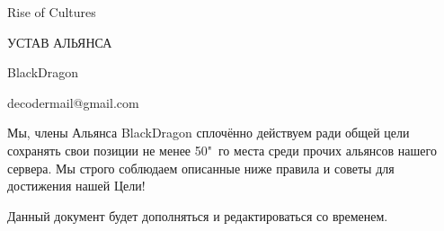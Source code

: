 \documentclass[utf8, 14pt]{my-class}
\begin{document}
    
    {
        \fancyhead{}
        \fancyfoot{}
        \fancyhead{}
    }
    
    \thispagestyle{firststyle}
    
    \vspace*{\fill}
    \begin{center}
        \Huge
        
        Rise of Cultures
        
        \bigskip
        
        УСТАВ АЛЬЯНСА
        
        BlackDragon
    \end{center}
    \vspace*{\fill}
    \begin{center}
        decodermail@gmail.com
    \end{center}

    \newpage
    
    {
        \hypersetup{linkcolor=black}
        \tableofcontents
    }
    
    \newpage
    
    Мы, члены Альянса BlackDragon сплочённо действуем ради общей цели сохранять свои позиции не менее 50"~го места среди прочих альянсов нашего сервера.
    Мы строго соблюдаем описанные ниже правила и советы для достижения нашей Цели!
    
    \bigskip
    
    Данный документ будет дополняться и редактироваться со временем.
    
    
    
    
    
    
    
\end{document}
